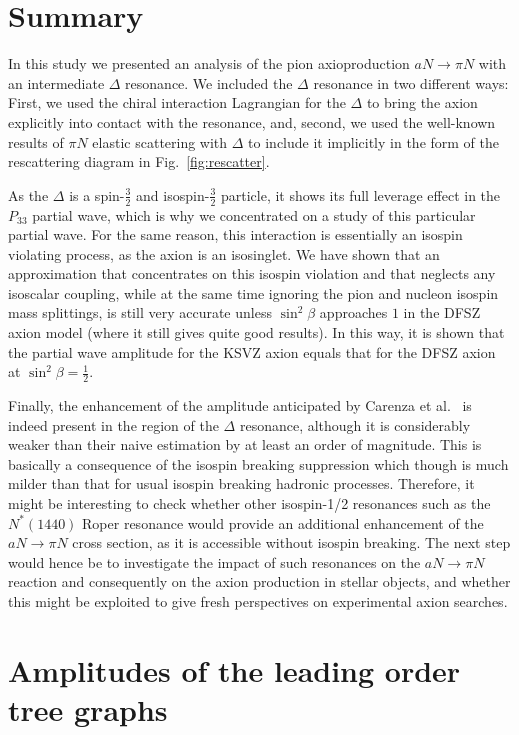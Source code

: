\documentclass[reprint,amssymb,amsmath,floatfix,aps,prd,groupedaddress,nofootinbib]{revtex4-2}
\begin{document}
\section{Summary}
In this study we presented an analysis of the pion axioproduction $aN\to\pi N$ with an
intermediate $\Delta$ resonance. We included the $\Delta$ resonance in two different ways: First, we
used the chiral interaction Lagrangian for the $\Delta$ to bring the axion explicitly into contact with
the resonance, and, second, we used the well-known results of $\pi N$ elastic scattering with $\Delta$
to include it implicitly in the form of the rescattering diagram in Fig.~\ref{fig:rescatter}. 

As the $\Delta$ is a spin-$\tfrac{3}{2}$ and isospin-$\tfrac{3}{2}$ particle, it shows its full leverage
effect in the $P_{33}$ partial wave, which is why we concentrated on a study of this particular partial wave.
For the same reason, this interaction is essentially an isospin violating process, as the axion is an isosinglet.
We have shown that an approximation that concentrates on this isospin violation and that neglects any
isoscalar coupling, while at the same time ignoring the pion and nucleon isospin mass splittings, is still very accurate
unless $\sin^2\beta$ approaches $1$ in the DFSZ axion model (where it still gives quite good results). In
this way, it is shown that the partial wave amplitude for the  KSVZ axion equals that for the DFSZ axion at
$\sin^2\beta=\tfrac{1}{2}$.

Finally, the enhancement of the amplitude anticipated by Carenza et al.~\cite{Carenza:2020cis} is indeed
present in the region of the $\Delta$ resonance, although it is considerably weaker than their naive estimation by at least an order of magnitude. This is basically a consequence of the isospin breaking suppression which though is much milder than that for usual isospin breaking hadronic processes. 
Therefore, it might be interesting to check whether other isospin-1/2 resonances such as the $N^*(1440)$ Roper resonance would provide an additional enhancement of the $aN\to\pi N$ cross section, as
it is accessible without isospin breaking. The next step would hence be to investigate the impact of
such resonances on the $aN\to\pi N$ reaction and consequently on the axion production in stellar objects, and
whether this might be exploited to give fresh perspectives on experimental axion searches. 

\appendix*
\section{Amplitudes of the leading order tree graphs}\label{app:1}
\end{document}
